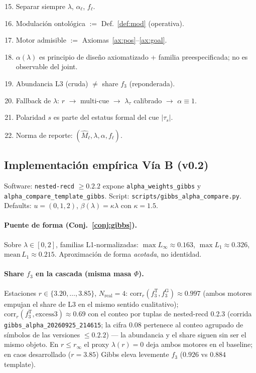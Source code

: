 \documentclass[11pt,a4paper]{article}
\theoremstyle{definition}
\theoremstyle{plain}
\theoremstyle{remark}
\begin{document}
\begin{enumerate}[label=\textbf{C\arabic*.}]
  \setcounter{enumi}{14}
  \item Separar siempre $\lambda$, $\alpha_\ell$, $f_\ell$.
  \item Modulación ontológica $:=$ Def.~\ref{def:mod} (operativa).
  \item Motor admisible $:=$ Axiomas~\ref{ax:pos}--\ref{ax:goal}.
  \item $\alpha(\lambda)$ es principio de dise\~no axiomatizado + familia
  preespecificada; no es observable del joint.
  \item Abundancia L3 (cruda) $\ne$ share $f_3$ (reponderada).
  \item Fallback de $\lambda$: $r$ $\to$ multi-cue $\to$ $\lambda_\tau$
  calibrado $\to$ $\alpha\equiv 1$.
  \item Polaridad $s$ es parte del estatus formal del cue $|\tau_s|$.
  \item Norma de reporte: $(\widehat{M}_\ell,\lambda,\alpha,f_\ell)$.
\end{enumerate}

\subsection{Implementaci\'on emp\'irica V\'ia B (v0.2)}
\label{sec:gibbs_emp}

Software: \texttt{nested-recd} $\ge 0.2.2$ expone
\texttt{alpha\_weights\_gibbs} y
\texttt{alpha\_compare\_template\_gibbs}.
Script: \texttt{scripts/gibbs\_alpha\_compare.py}.
Defaults: $u=(0,1,2)$, $\beta(\lambda)=\kappa\lambda$ con $\kappa=1.5$.

\paragraph{Puente de forma (Conj.~\ref{conj:gibbs}).}
Sobre $\lambda\in[0,2]$, familias L1-normalizadas:
$\max L_\infty\approx 0.163$, $\max L_1\approx 0.326$,
$\mathrm{mean}\,L_1\approx 0.215$. Aproximaci\'on de forma
\emph{acotada}, no identidad.

\paragraph{Share $f_3$ en la cascada (misma masa $\Phi$).}
Estaciones $r\in\{3.20,\ldots,3.85\}$, $N_{\mathrm{real}}=4$:
$\mathrm{corr}_r(f_3^{\mathrm{T}},f_3^{\mathrm{G}})\approx 0.997$
(ambos motores empujan el share de L3 en el mismo sentido cualitativo);
$\mathrm{corr}_r(f_3^{\mathrm{T}},\mathrm{excess3})\approx 0.69$
con el conteo por tuplas de nested-recd 0.2.3
(corrida \texttt{gibbs\_alpha\_20260925\_214615}; la cifra $0.08$
pertenece al conteo agrupado de s\'imbolos de las versiones $\le 0.2.2$)
--- la abundancia y el share siguen sin ser el mismo objeto.
En $r\le r_\infty$ el proxy $\lambda(r)=0$ deja ambos motores en el
baseline; en caos desarrollado ($r=3.85$) Gibbs eleva levemente
$f_3$ ($0.926$ vs $0.884$ template).
\end{document}
